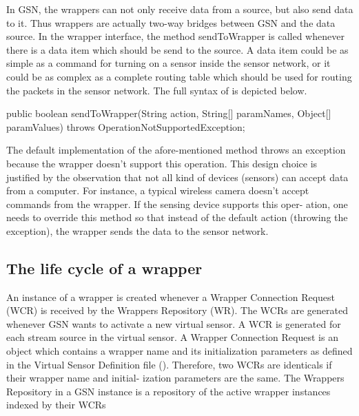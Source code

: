 In GSN, the wrappers can not only receive data from a source, but also send
data to it. Thus wrappers are actually two-way bridges between GSN and the
data source. In the wrapper interface, the method sendToWrapper is called
whenever there is a data item which should be send to the source. A data
item could be as simple as a command for turning on a sensor inside the sensor
network, or it could be as complex as a complete routing table which should
be used for routing the packets in the sensor network. The full syntax of 
 is depicted below.
\begin{javacode}
	public boolean sendToWrapper(String action,
		String[] paramNames, Object[] paramValues)
		throws OperationNotSupportedException;
\end{javacode}
The default implementation of the afore-mentioned method throws an 
exception because the wrapper doesn't support this operation. This design
choice is justified by the observation that not all kind of devices (sensors) can
accept data from a computer. For instance, a typical wireless camera doesn't
accept commands from the wrapper. If the sensing device supports this oper-
ation, one needs to override this method so that instead of the default action
(throwing the exception), the wrapper sends the data to the sensor network.

\subsection{The life cycle of a wrapper}
An instance of a wrapper is created whenever a Wrapper Connection Request
(WCR) is received by the Wrappers Repository (WR). The WCRs are generated
whenever GSN wants to activate a new virtual sensor. A WCR is generated for
each stream source in the virtual sensor.
A Wrapper Connection Request is an object which contains a wrapper name
and its initialization parameters as defined in the Virtual Sensor Definition
file (\vsd). Therefore, two WCRs are identicals if their wrapper name and initial-
ization parameters are the same. The Wrappers Repository in a GSN instance
is a repository of the active wrapper instances indexed by their WCRs

